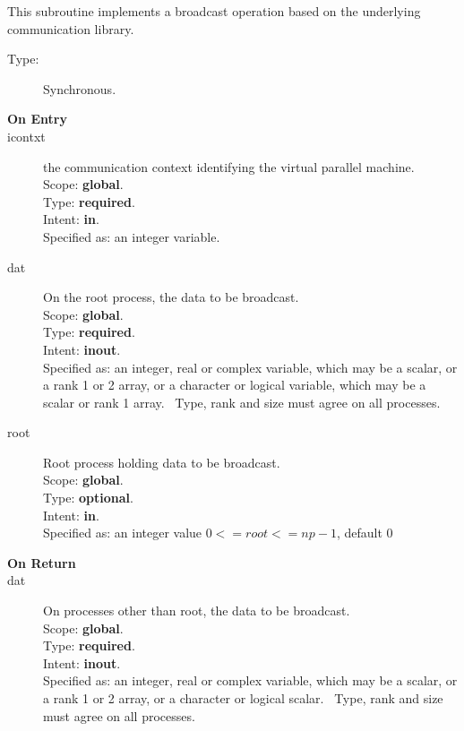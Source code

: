 

This subroutine implements a broadcast operation based on the
underlying communication library. 
\begin{description}
\item[Type:] Synchronous.
\item[\bf  On Entry ]
\item[icontxt] the communication context identifying the virtual
  parallel machine.\\
Scope: {\bf global}.\\
Type: {\bf required}.\\
Intent: {\bf in}.\\
Specified as: an integer variable.
\item[dat] On the root process, the data to be broadcast.\\
Scope: {\bf global}.\\
Type: {\bf required}.\\
Intent: {\bf inout}.\\
Specified as: an integer, real or complex variable, which may be a
scalar, or a rank 1 or 2 array, or a character or logical variable,
which may be a scalar or rank 1 array. \
Type, rank and size must agree on all processes.
\item[root] Root process holding data to be broadcast.\\
Scope: {\bf global}.\\
Type: {\bf optional}.\\
Intent: {\bf in}.\\
Specified as: an integer value $0<= root <= np-1$, default 0 \
\end{description}


\begin{description}
\item[\bf On Return]
\item[dat] On processes other than  root, the data to be broadcast.\\
Scope: {\bf global}.\\
Type: {\bf required}.\\
Intent: {\bf inout}.\\
Specified as: an integer, real or complex variable, which may be a
scalar, or a rank 1 or 2 array, or a character or logical scalar. \
Type, rank and size must agree on all processes.
\end{description}


